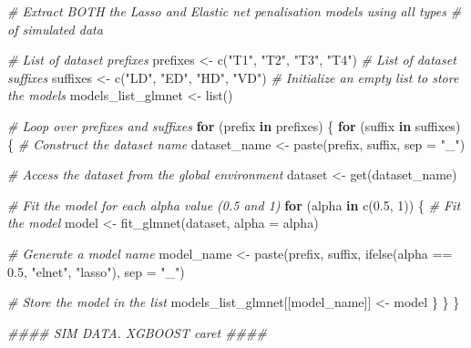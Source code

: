 \documentclass[
  11pt,
]{article}
\newenvironment{Shaded}{}{}
\newcommand{\AttributeTok}[1]{\textcolor[rgb]{0.49,0.56,0.16}{#1}}
\newcommand{\CommentTok}[1]{\textcolor[rgb]{0.38,0.63,0.69}{\textit{#1}}}
\newcommand{\ControlFlowTok}[1]{\textcolor[rgb]{0.00,0.44,0.13}{\textbf{#1}}}
\newcommand{\DecValTok}[1]{\textcolor[rgb]{0.25,0.63,0.44}{#1}}
\newcommand{\DocumentationTok}[1]{\textcolor[rgb]{0.73,0.13,0.13}{\textit{#1}}}
\newcommand{\FloatTok}[1]{\textcolor[rgb]{0.25,0.63,0.44}{#1}}
\newcommand{\FunctionTok}[1]{\textcolor[rgb]{0.02,0.16,0.49}{#1}}
\newcommand{\NormalTok}[1]{#1}
\newcommand{\OtherTok}[1]{\textcolor[rgb]{0.00,0.44,0.13}{#1}}
\newcommand{\SpecialCharTok}[1]{\textcolor[rgb]{0.25,0.44,0.63}{#1}}
\newcommand{\StringTok}[1]{\textcolor[rgb]{0.25,0.44,0.63}{#1}}
\begin{document}
\begin{Shaded}
\begin{Highlighting}[]
\CommentTok{\# Extract BOTH the Lasso and Elastic net penalisation models using all types }
\CommentTok{\#   of simulated data }

\CommentTok{\# List of dataset prefixes}
\NormalTok{prefixes }\OtherTok{\textless{}{-}} \FunctionTok{c}\NormalTok{(}\StringTok{"T1"}\NormalTok{, }\StringTok{"T2"}\NormalTok{, }\StringTok{"T3"}\NormalTok{, }\StringTok{"T4"}\NormalTok{)}
\CommentTok{\# List of dataset suffixes}
\NormalTok{suffixes }\OtherTok{\textless{}{-}} \FunctionTok{c}\NormalTok{(}\StringTok{"LD"}\NormalTok{, }\StringTok{"ED"}\NormalTok{, }\StringTok{"HD"}\NormalTok{, }\StringTok{"VD"}\NormalTok{)}
\CommentTok{\# Initialize an empty list to store the models}
\NormalTok{models\_list\_glmnet }\OtherTok{\textless{}{-}} \FunctionTok{list}\NormalTok{()}

\CommentTok{\# Loop over prefixes and suffixes}
\ControlFlowTok{for}\NormalTok{ (prefix }\ControlFlowTok{in}\NormalTok{ prefixes) \{}
  \ControlFlowTok{for}\NormalTok{ (suffix }\ControlFlowTok{in}\NormalTok{ suffixes) \{}
    \CommentTok{\# Construct the dataset name}
\NormalTok{    dataset\_name }\OtherTok{\textless{}{-}} \FunctionTok{paste}\NormalTok{(prefix, suffix, }\AttributeTok{sep =} \StringTok{"\_"}\NormalTok{)}
    
    \CommentTok{\# Access the dataset from the global environment}
\NormalTok{    dataset }\OtherTok{\textless{}{-}} \FunctionTok{get}\NormalTok{(dataset\_name)}
    
    \CommentTok{\# Fit the model for each alpha value (0.5 and 1)}
    \ControlFlowTok{for}\NormalTok{ (alpha }\ControlFlowTok{in} \FunctionTok{c}\NormalTok{(}\FloatTok{0.5}\NormalTok{, }\DecValTok{1}\NormalTok{)) \{}
      \CommentTok{\# Fit the model}
\NormalTok{      model }\OtherTok{\textless{}{-}} \FunctionTok{fit\_glmnet}\NormalTok{(dataset, }\AttributeTok{alpha =}\NormalTok{ alpha)}
      
      \CommentTok{\# Generate a model name}
\NormalTok{      model\_name }\OtherTok{\textless{}{-}} \FunctionTok{paste}\NormalTok{(prefix, suffix, }\FunctionTok{ifelse}\NormalTok{(alpha }\SpecialCharTok{==} \FloatTok{0.5}\NormalTok{, }\StringTok{"elnet"}\NormalTok{, }\StringTok{"lasso"}\NormalTok{), }\AttributeTok{sep =} \StringTok{"\_"}\NormalTok{)}
      
      \CommentTok{\# Store the model in the list}
\NormalTok{      models\_list\_glmnet[[model\_name]] }\OtherTok{\textless{}{-}}\NormalTok{ model}
\NormalTok{    \}}
\NormalTok{  \}}
\NormalTok{\}}

\DocumentationTok{\#\#\#\# SIM DATA. XGBOOST \textquotesingle{}caret\textquotesingle{} \#\#\#\#}


\end{Highlighting}
\end{Shaded}
\end{document}
